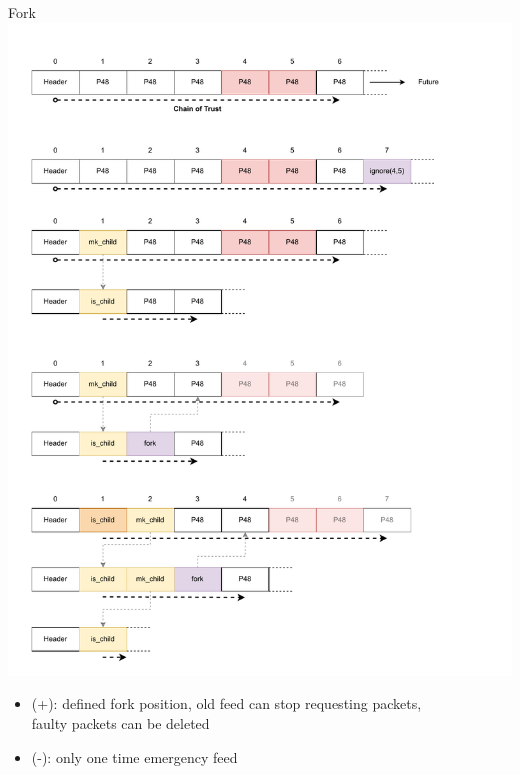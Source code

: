 \documentclass[aspectratio=169]{beamer}
\begin{document}
\begin{frame}[c]{Fork}
        \includegraphics[width=1\textwidth]{images/fork_4.pdf}
        \begin{itemize}
        		\item (+): defined fork position, old feed can stop requesting packets, \\faulty packets can be deleted
		\item (-): only one time emergency feed
	\end{itemize}
\end{frame}
\end{document}
